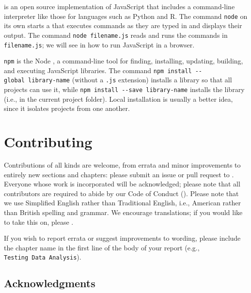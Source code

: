  is an open source implementation of JavaScript
that includes a command-line interpreter like those for languages such as Python and R.
The command \texttt{node} on its own starts a 
that executes commands as they are typed in and displays their output.
The command \texttt{node\ filename.js} reads and runs the commands in \texttt{filename.js};
we will see in  how to run JavaScript in a browser.

\texttt{npm}
is the Node ,
a command-line tool for finding, installing, updating, building, and executing JavaScript libraries.
The command \texttt{npm\ install\ -\/-global\ library-name} (without a \texttt{.js} extension)
installs a library  so that all projects can use it,
while \texttt{npm\ install\ -\/-save\ library-name} installs the library 
(i.e., in the current project folder).
Local installation is usually a better idea,
since it isolates projects from one another.

\section{Contributing}\label{s:index-contrib}

Contributions of all kinds are welcome, from errata and minor improvements to
entirely new sections and chapters: please submit an issue or pull
request to . Everyone whose work is incorporated will be acknowledged;
please note that all contributors are required to abide by our Code of Conduct
().  Please note that we use Simplified English rather than
Traditional English, i.e., American rather than British spelling and grammar. We
encourage translations; if you would like to take this on, please
.

If you wish to report errata or suggest improvements to wording, please include
the chapter name in the first line of the body of your report (e.g., \texttt{Testing\ Data\ Analysis}).

\subsection{Acknowledgments}\label{s:intro-acknowledgments}

